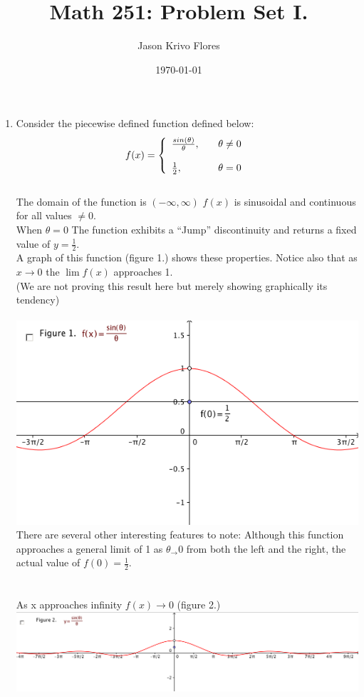 \documentclass{article}
\title{Math 251: Problem Set I.}
\author{Jason Krivo Flores}
\date{\today}
\begin{document}
\maketitle{}
%
\begin{enumerate}

\item Consider the piecewise defined function defined below:\\
\[
  f(x) = \left\{ 
  \begin{array}{l l}
    \frac{ sin(\theta)}{\theta}, \quad &  \theta \neq 0\\
    \\
      \frac{1}{2},  \quad &  \theta= 0\\
  \end{array} \right. \\
\]
\\
The domain of the function is $(-\infty, \infty)$
$f(x)$ is sinusoidal and continuous for all values $\neq 0$.\\ When $\theta = 0$ The function exhibits a ``Jump'' discontinuity and returns a fixed value of $y = \frac{1}{2}$.\\
A graph of this function (figure 1.) shows these properties. Notice also that as $x \to 0$ the $ \lim f(x) $ approaches 1.\\
(We are not proving this result here but merely showing graphically its tendency)\\
\\ \includegraphics[scale=0.5]{singraph}\\
There are several other interesting features to note: Although this function approaches a general limit of 1 as $\theta_\to 0$ from both the left and the right, the actual value of $f(0) = \frac{1}{2}$.\\
\\
\\As x approaches infinity $f (x) \to 0$ (figure 2.)\\
%
{\includegraphics[scale=0.45]{longview}}\\


\end{enumerate}
\end{document}
